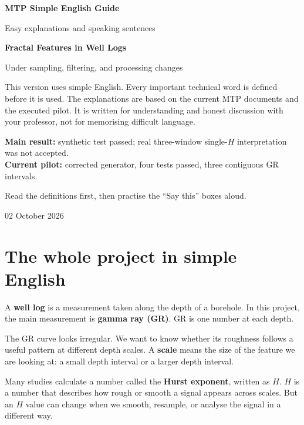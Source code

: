 \documentclass[11pt,a4paper]{article}
\newcommand{\term}[1]{\textbf{\color{Navy}#1}}
\begin{document}
\begin{titlepage}
\centering
\vspace*{0.9cm}
{\Huge\bfseries\color{Navy} MTP Simple English Guide\par}
\vspace{0.35cm}
{\Large\color{Teal} Easy explanations and speaking sentences\par}
\vspace{0.8cm}
{\LARGE\bfseries Fractal Features in Well Logs\par}
\vspace{0.3cm}
{\large Under sampling, filtering, and processing changes\par}
\vspace{0.8cm}
\begin{minipage}{0.87\textwidth}
This version uses simple English. Every important technical word is defined before it is used. The explanations are based on the current MTP documents and the executed pilot. It is written for understanding and honest discussion with your professor, not for memorising difficult language.
\end{minipage}
\vfill
\textbf{Main result:} synthetic test passed; real three-window single-$H$ interpretation was not accepted.\\
\textbf{Current pilot:} corrected generator, four tests passed, three contiguous GR intervals.
\vfill
{\large Read the definitions first, then practise the ``Say this'' boxes aloud.\par}
\vfill
{\large 02 October 2026\par}
\end{titlepage}

\section{The whole project in simple English}
A \term{well log} is a measurement taken along the depth of a borehole. In this project, the main measurement is \term{gamma ray (GR)}. GR is one number at each depth.

The GR curve looks irregular. We want to know whether its roughness follows a useful pattern at different depth scales. A \term{scale} means the size of the feature we are looking at: a small depth interval or a larger depth interval.

Many studies calculate a number called the \term{Hurst exponent}, written as $H$. $H$ is a number that describes how rough or smooth a signal appears across scales. But an $H$ value can change when we smooth, resample, or analyse the signal in a different way.
\end{document}
